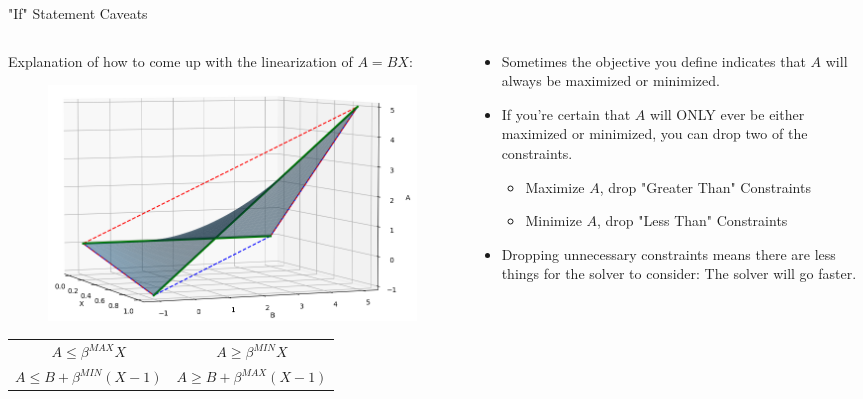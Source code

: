 \documentclass[10pt, aspectratio=169]{beamer}
\begin{document}
\begin{frame}{"If" Statement Caveats}
    \begin{columns}
        \begin{column}{0.5\textwidth}
            \begin{center}
                Explanation of how to come up with the linearization of $A=BX$:
                \begin{figure}
                    \includegraphics[width=\linewidth]{DoubleSidedBigM.png}
                \end{figure}
            \end{center}
            \begin{tabular}{c c}
                $A \leq \beta^{MAX} X$ & $A \geq \beta^{MIN}X$ \\
                $A \leq B + \beta^{MIN}(X-1)$ & $A \geq B + \beta^{MAX}(X-1)$
            \end{tabular}
        \end{column}
        \begin{column}{0.5\textwidth}

            \begin{itemize}
                \item Sometimes the objective you define indicates that $A$ will always be maximized or minimized.
                \item If you're certain that $A$ will ONLY ever be either maximized or minimized, you can drop two of the constraints.
                \begin{itemize}
                    \item Maximize $A$, drop "Greater Than" Constraints
                    \item Minimize $A$, drop "Less Than" Constraints
                \end{itemize}
                \item Dropping unnecessary constraints means there are less things for the solver to consider: The solver will go faster.
            \end{itemize}
        \end{column}
    \end{columns}
\end{frame}
\end{document}
